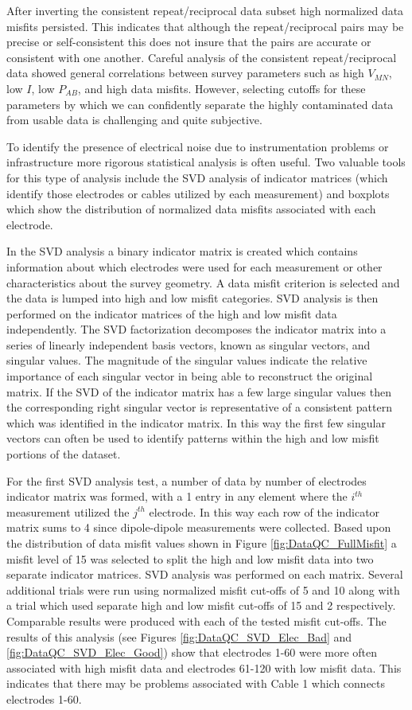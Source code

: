\documentclass[final,authoryear,5p,times,twocolumn]{elsarticle}
\begin{document}
After inverting the consistent repeat/reciprocal data subset high normalized data misfits persisted. This indicates that although the repeat/reciprocal pairs may be precise or self-consistent this does not insure that the pairs are accurate or consistent with one another. Careful analysis of the consistent repeat/reciprocal data showed general correlations between survey parameters such as high $V_{MN}$, low $I$, low $P_{AB}$, and high data misfits. However, selecting cutoffs for these parameters by which we can confidently separate the highly contaminated data from usable data is challenging and quite subjective.           

To identify the presence of electrical noise due to instrumentation problems or infrastructure more rigorous statistical analysis is often useful. Two valuable tools for this type of analysis include the SVD analysis of indicator matrices (which identify those electrodes or cables utilized by each measurement) and boxplots which show the distribution of normalized data misfits associated with each electrode. 

In the SVD analysis a binary indicator matrix is created which contains information about which electrodes were used for each measurement or other characteristics about the survey geometry. A data misfit criterion is selected and the data is lumped into high and low misfit categories. SVD analysis is then performed on the indicator matrices of the high and low misfit data independently. The SVD factorization decomposes the indicator matrix into a series of linearly independent basis vectors, known as singular vectors, and singular values. The magnitude of the singular values indicate the relative importance of each singular vector in being able to reconstruct the original matrix. If the SVD of the indicator matrix has a few large singular values then the corresponding right singular vector is representative of a consistent pattern which was identified in the indicator matrix. In this way the first few singular vectors can often be used to identify patterns within the high and low misfit portions of the dataset. 

For the first SVD analysis test, a number of data by number of electrodes indicator matrix was formed, with a 1 entry in any element where the $i^{th}$ measurement utilized the $j^{th}$ electrode. In this way each row of the indicator matrix sums to 4 since dipole-dipole measurements were collected. Based upon the distribution of data misfit values shown in Figure \ref{fig:DataQC_FullMisfit} a misfit level of 15 was selected to split the high and low misfit data into two separate indicator matrices. SVD analysis was performed on each matrix. Several additional trials were run using normalized misfit cut-offs of 5 and 10 along with a trial which used separate high and low misfit cut-offs of 15 and 2 respectively. Comparable results were produced with each of the tested misfit cut-offs. The results of this analysis (see Figures \ref{fig:DataQC_SVD_Elec_Bad} and \ref{fig:DataQC_SVD_Elec_Good}) show that electrodes 1-60 were more often associated with high misfit data and electrodes 61-120 with low misfit data. This indicates that there may be problems associated with Cable 1 which connects electrodes 1-60.  
\end{document}
